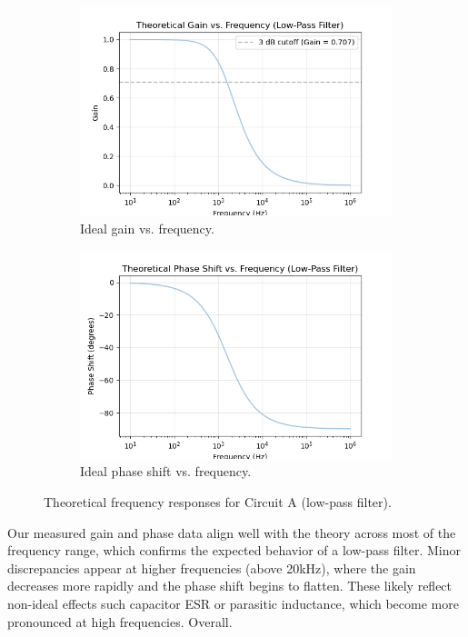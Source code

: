 \documentclass{article}
\begin{document}
\begin{figure}[H]
    \centering
    \begin{subfigure}[b]{0.48\textwidth}
        \centering
        \includegraphics[width=\textwidth]{2.3.a.gain.png}
        \caption{Ideal gain vs. frequency.}
        \label{fig:a_theory_gain}
    \end{subfigure}
    \hfill
    \begin{subfigure}[b]{0.48\textwidth}
        \centering
        \includegraphics[width=\textwidth]{2.3.a.phase.png}
        \caption{Ideal phase shift vs. frequency.}
        \label{fig:a_theory_phase}
    \end{subfigure}
    \caption{Theoretical frequency responses for Circuit A (low-pass filter).}
    \label{fig:a_theory}
\end{figure}

\noindent Our measured gain and phase data align well with the theory
across most of the frequency range, which confirms the expected behavior of a
low-pass filter. Minor discrepancies appear at higher frequencies (above 20kHz),
where the gain decreases more rapidly and the phase shift begins to flatten.
These likely reflect non-ideal effects such capacitor ESR or parasitic
inductance, which become more pronounced at high frequencies. Overall.
\end{document}

